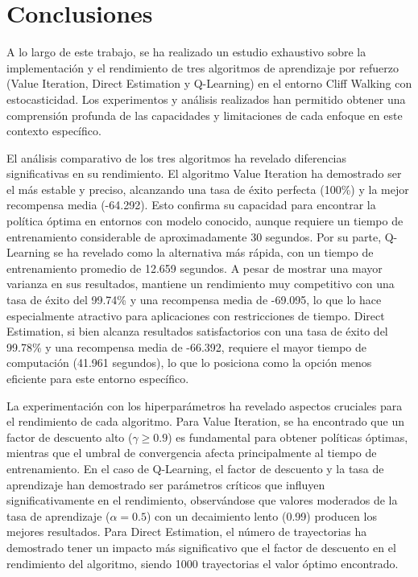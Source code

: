 \section{Conclusiones}

A lo largo de este trabajo, se ha realizado un estudio exhaustivo sobre la implementación y el rendimiento de tres algoritmos de aprendizaje por refuerzo (Value Iteration, Direct Estimation y Q-Learning) en el entorno Cliff Walking con estocasticidad. Los experimentos y análisis realizados han permitido obtener una comprensión profunda de las capacidades y limitaciones de cada enfoque en este contexto específico.

El análisis comparativo de los tres algoritmos ha revelado diferencias significativas en su rendimiento. El algoritmo Value Iteration ha demostrado ser el más estable y preciso, alcanzando una tasa de éxito perfecta (100\%) y la mejor recompensa media (-64.292). Esto confirma su capacidad para encontrar la política óptima en entornos con modelo conocido, aunque requiere un tiempo de entrenamiento considerable de aproximadamente 30 segundos. Por su parte, Q-Learning se ha revelado como la alternativa más rápida, con un tiempo de entrenamiento promedio de 12.659 segundos. A pesar de mostrar una mayor varianza en sus resultados, mantiene un rendimiento muy competitivo con una tasa de éxito del 99.74\% y una recompensa media de -69.095, lo que lo hace especialmente atractivo para aplicaciones con restricciones de tiempo. Direct Estimation, si bien alcanza resultados satisfactorios con una tasa de éxito del 99.78\% y una recompensa media de -66.392, requiere el mayor tiempo de computación (41.961 segundos), lo que lo posiciona como la opción menos eficiente para este entorno específico.

La experimentación con los hiperparámetros ha revelado aspectos cruciales para el rendimiento de cada algoritmo. Para Value Iteration, se ha encontrado que un factor de descuento alto ($\gamma \geq 0.9$) es fundamental para obtener políticas óptimas, mientras que el umbral de convergencia afecta principalmente al tiempo de entrenamiento. En el caso de Q-Learning, el factor de descuento y la tasa de aprendizaje han demostrado ser parámetros críticos que influyen significativamente en el rendimiento, observándose que valores moderados de la tasa de aprendizaje ($\alpha = 0.5$) con un decaimiento lento (0.99) producen los mejores resultados. Para Direct Estimation, el número de trayectorias ha demostrado tener un impacto más significativo que el factor de descuento en el rendimiento del algoritmo, siendo 1000 trayectorias el valor óptimo encontrado.

